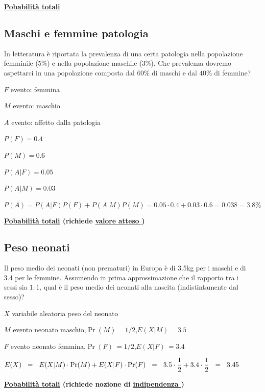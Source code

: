 \documentclass[12pt,openany]{book}
\theoremstyle{mio}
\theoremstyle{liscio}
\begin{document}
\hfill\textbf{{\color{brown}\hyperref[TeoremaProbabilitaTotali]{Pobabilità totali} \faShare}}
\subsection{Maschi e femmine patologia}
\label{MF_totali}



In letteratura è riportata la prevalenza di una certa patologia nella popolazione femminile ($5\%$) e nella popolazione maschile ($3\%$). Che prevalenza dovremo aspettarci in una popolazione composta dal $60\%$ di maschi e dal $40\%$ di femmine?

$F$ evento: femmina

$M$ evento: maschio

$A$ evento: affetto dalla patologia

$P(F)=0.4$

$P(M)=0.6$

$P(A|F)=0.05$

$P(A|M)=0.03$

$P(A)=P(A|F)P(F)+P(A|M)P(M)=0.05\cdot0.4+0.03\cdot0.6=0.038=3.8\%$


\hfill{}\clearpage
\hfill\textbf{{\color{brown}\hyperref[TeoremaProbabilitaTotali]{Pobabilità totali} \faShare} (richiede \hyperref[ValoreAtteso]{valore atteso \faShare})}
\subsection{Peso neonati}
\label{Neonati_totali}

Il peso medio dei neonati (non prematuri) in Europa è di 3.5kg per i maschi e di 3.4 per le femmine. Assumendo in prima approssimazione che il rapporto tra i sessi sia $1:1$, qual è il peso medio dei neonati alla nascita (indistintamente dal sesso)?

$X$ variabile aleatoria peso del neonato

$M$ evento neonato maschio,\quad $\Pr(M)=1/2$,\quad $E(X|M)=3.5$

$F$ evento neonato femmina,\quad $\Pr(F)\ =1/2$,\quad $E(X|F)\ =3.4$


$E(X)\medrel{=}E(X|M)\cdot\Pr(M)+ E(X|F)\cdot\Pr(F)\medrel{=}3.5\cdot\dfrac12 + 3.4\cdot\dfrac12\medrel{=}3.45$



\hfill{}\clearpage
\hfill\textbf{{\color{brown}\hyperref[TeoremaProbabilitaTotali]{Pobabilità totali} \faShare} (richiede nozione di \hyperref[indipendenza]{indipendenza \faShare})}
\end{document}

